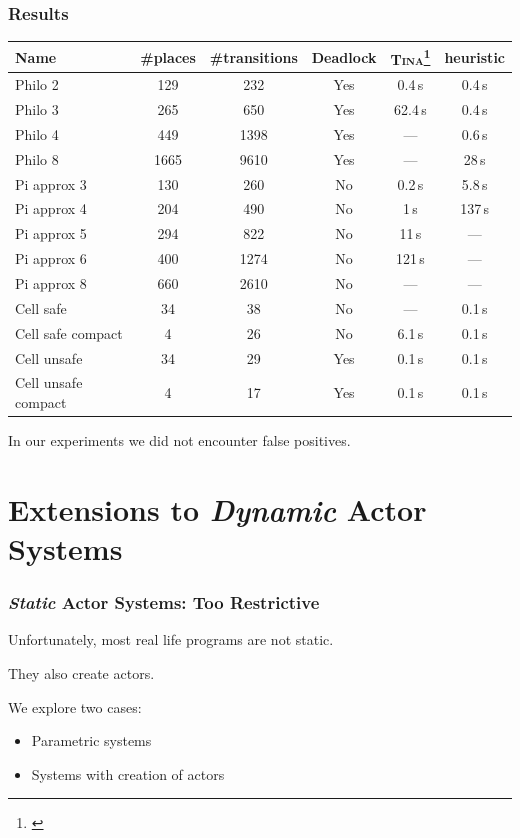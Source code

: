 \documentclass{beamer}
\theoremstyle{remark}
\theoremstyle{definition}
\begin{document}
\begin{frame}
\frametitle{Results}
{\scriptsize
\begin{tabular}{l|cc|c|c|c}
Name & \#places & \#transitions & Deadlock & \textsc{Tina}\footnote{\cite{DBLP:conf/qest/BerthomieuV06}} & heuristic \\
\hline
\hline
Philo 2             & 129     & 232          & Yes      & 0.4\,s   & 0.4\,s \\
Philo 3             & 265     & 650          & Yes      & 62.4\,s  & 0.4\,s \\
Philo 4             & 449     & 1398         & Yes      & ---      & 0.6\,s \\
Philo 8             & 1665    & 9610         & Yes      & ---      & 28\,s \\
\hline
Pi approx 3         & 130     & 260          & No       & 0.2\,s   & 5.8\,s \\
Pi approx 4         & 204     & 490          & No       & 1\,s     & 137\,s \\
Pi approx 5         & 294     & 822          & No       & 11\,s    & --- \\
Pi approx 6         & 400     & 1274         & No       & 121\,s   & --- \\
Pi approx 8         & 660     & 2610         & No       & ---      & --- \\
\hline
Cell safe           & 34      & 38           & No       & ---      & 0.1\,s \\
Cell safe compact   & 4       & 26           & No       & 6.1\,s   & 0.1\,s \\
Cell unsafe         & 34      & 29           & Yes      & 0.1\,s   & 0.1\,s \\
Cell unsafe compact & 4       & 17           & Yes      & 0.1\,s   & 0.1\,s    
\end{tabular}
}

\vspace{20pt}

In our experiments we did not encounter false positives.
\end{frame}

\section{Extensions to {\em Dynamic} Actor Systems}

\begin{frame}
\frametitle{{\em Static} Actor Systems: Too Restrictive}

Unfortunately, most real life programs are not static.

They also \alert{create actors}.

\vspace{10pt}
We explore two cases:
\begin{itemize}
\item Parametric systems
\item Systems with creation of actors
\end{itemize}


\end{frame}
\end{document}
